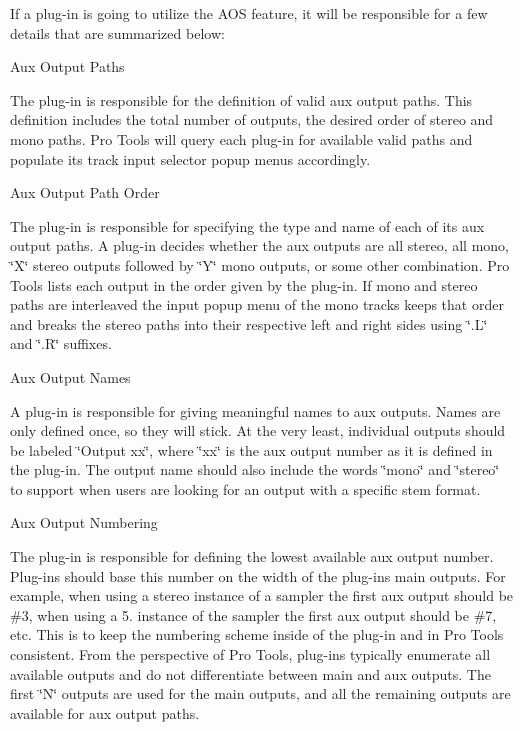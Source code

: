 If a plug-\/in is going to utilize the A\+O\+S feature, it will be responsible for a few details that are summarized below\+: 
\begin{DoxyItemize}
\item  Aux Output Paths

The plug-\/in is responsible for the definition of valid aux output paths. This definition includes the total number of outputs, the desired order of stereo and mono paths. Pro Tools will query each plug-\/in for available valid paths and populate its track input selector popup menus accordingly.


\item  Aux Output Path Order

The plug-\/in is responsible for specifying the type and name of each of its aux output paths. A plug-\/in decides whether the aux outputs are all stereo, all mono, \char`\"{}\+X\char`\"{} stereo outputs followed by \char`\"{}\+Y\char`\"{} mono outputs, or some other combination. Pro Tools lists each output in the order given by the plug-\/in. If mono and stereo paths are interleaved the input popup menu of the mono tracks keeps that order and breaks the stereo paths into their respective left and right sides using \char`\"{}.\+L\char`\"{} and \char`\"{}.\+R\char`\"{} suffixes.


\item  Aux Output Names

A plug-\/in is responsible for giving meaningful names to aux outputs. Names are only defined once, so they will stick. At the very least, individual outputs should be labeled \char`\"{}\+Output xx\char`\"{}, where \char`\"{}xx\char`\"{} is the aux output number as it is defined in the plug-\/in. The output name should also include the words \char`\"{}mono\char`\"{} and \char`\"{}stereo\char`\"{} to support when users are looking for an output with a specific stem format.


\item  Aux Output Numbering

The plug-\/in is responsible for defining the lowest available aux output number. Plug-\/ins should base this number on the width of the plug-\/in\textquotesingle{}s main outputs. For example, when using a stereo instance of a sampler the first aux output should be \#3, when using a 5. instance of the sampler the first aux output should be \#7, etc. This is to keep the numbering scheme inside of the plug-\/in and in Pro Tools consistent. From the perspective of Pro Tools, plug-\/ins typically enumerate all available outputs and do not differentiate between main and aux outputs. The first \char`\"{}\+N\char`\"{} outputs are used for the main outputs, and all the remaining outputs are available for aux output paths.



\end{DoxyItemize}
